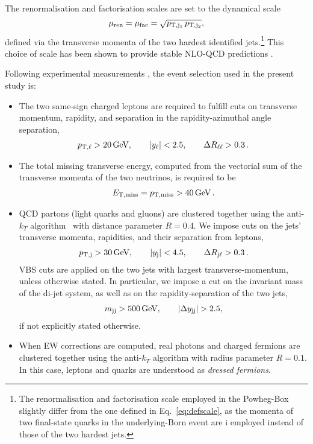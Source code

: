 The renormalisation and factorisation scales are set to the dynamical scale
%
\begin{equation}
\label{eq:defscale}
 \mu_{\rm ren} = \mu_{\rm fac} = \sqrt{p_{\rm T, j_1}\, p_{\rm T, j_2}}, 
\end{equation}
%
defined via the transverse momenta of the two hardest identified jets.\footnote{
    The renormalisation and factorisation scale employed in the {\sc Powheg-Box} slightly differ from the 
    one defined in Eq.~\eqref{eq:defscale}, as the momenta of two final-state quarks in the underlying-Born event are i
    employed instead of those of the two hardest jets.} 
This choice of scale has been shown to provide stable NLO-QCD predictions \cite{Denner:2012dz}.

Following experimental measurements \cite{Aad:2014zda,Aaboud:2016ffv,Khachatryan:2014sta,CMS:2017adb}, the event selection used in the present study is:

\begin{itemize}
    \item The two same-sign charged leptons are required to fulfill cuts on transverse momentum, rapidity, and separation in the rapidity-azimuthal angle separation, 
        \begin{align}
        \label{cut:1}
         p_{\text{T},\ell} >  20\,\text{GeV},\qquad |y_{\ell}| < 2.5, \qquad \Delta R_{\ell\ell}> 0.3\,.
        \end{align}
    \item The total missing transverse energy, computed from the vectorial sum of the transverse momenta of the two neutrinos, is required to be
        \begin{align}
        \label{cut:2}
          E_{\text{T},\text{miss}}=p_{\rm T, miss} >  40\,\text{GeV}\,.
        \end{align}
    \item QCD partons (light quarks and gluons) are clustered together using the anti-$k_T$ algorithm~\cite{Cacciari:2008gp} with distance parameter $R=0.4$. %
    We impose cuts on the jets' transverse momenta, rapidities, and their separation from leptons,  
        \begin{align}
        \label{cut:3}
         p_{\text{T},\text{j}} >  30\,\text{GeV}, \qquad |y_\text{j}| < 4.5, \qquad \Delta R_{\text{j}\ell} > 0.3 \,.
        \end{align}
        VBS cuts are applied on the two jets with largest transverse-momentum, unless otherwise stated. In particular, we impose a cut on the 
         in\-vari\-ant mass of the di-jet system,  as well as on the rapidity-separation of the two jets,          \begin{align}
        \label{cut:4}
         m_{\text{j} \text{j}} >  500\,\text{GeV},\qquad |\Delta y_{\text{j} \text{j}}| > 2.5, 
        \end{align}
        if not explicitly stated otherwise. 
    \item When EW corrections are computed, real photons and charged fermions are clustered together using the anti-$k_T$ algorithm with
        radius parameter $R=0.1$. In this case, leptons and quarks are understood as {\it dressed fermions}.
\end{itemize}
